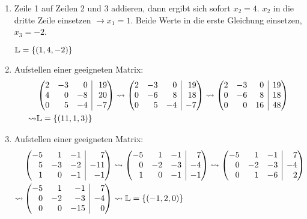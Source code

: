 \begin{lsg}{}
\begin{enumerate}
	\item Zeile 1 auf Zeilen 2 und 3 addieren, dann ergibt sich sofort $x_2=4$. $x_2$ in die dritte Zeile einsetzen $\rightarrow x_1=1$. Beide Werte in die erste Gleichung einsetzen, $x_3=-2$.

	$\mathbb{L}=\left\{ (1,4,-2) \right\}$
	\item Aufstellen einer geeigneten Matrix:
	\begin{align*}
		&\ematrix{rrr|r}{2&-3&0&19\\4&0&-8&20\\0&5&-4&-7}
		\rightsquigarrow\ematrix{rrr|r}{2&-3&0&19\\0&-6&8&18\\0&5&-4&-7}\rightsquigarrow\ematrix{rrr|r}{2&-3&0&19\\0&-6&8&18\\0&0&16&48}\\
		\rightsquigarrow&\mathbb{L}=\simpleset{(11,1,3)}
	\end{align*}

	\item Aufstellen einer geeigneten Matrix:
	\begin{align*}
		&\ematrix{rrr|r}{-5&1&-1&7\\5&-3&-2&-11\\1&0&-1&-1}
		\rightsquigarrow\ematrix{rrr|r}{-5&1&-1&7\\0&-2&-3&-4\\1&0&-1&-1}
		\rightsquigarrow\ematrix{rrr|r}{-5&1&-1&7\\0&-2&-3&-4\\0&1&-6&2}\\
		\rightsquigarrow&\ematrix{rrr|r}{-5&1&-1&7\\0&-2&-3&-4\\0&0&-15&0}
		\rightsquigarrow\mathbb{L}=\simpleset{(-1,2,0)}
	\end{align*}
\end{enumerate}
\end{lsg}


